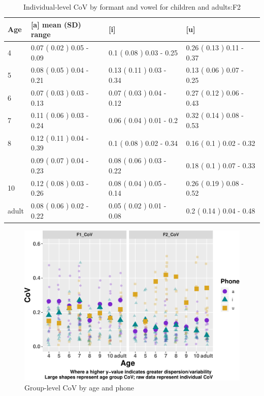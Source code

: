 \documentclass[
]{article}
\begin{document}
\begin{table}[!h]

\caption{\label{tab:delta-disp-tbl-spkr}Individual-level CoV by formant and vowel for children and adults:F2}
\centering
\begin{tabular}[t]{llll}
\toprule
Age & [a] mean (SD) range & [i] & [u]\\
\midrule
4 & 0.07 ( 0.02 ) 0.05 - 0.09 & 0.1 ( 0.08 ) 0.03 - 0.25 & 0.26 ( 0.13 ) 0.11 - 0.37\\
5 & 0.08 ( 0.05 ) 0.04 - 0.21 & 0.13 ( 0.11 ) 0.03 - 0.34 & 0.13 ( 0.06 ) 0.07 - 0.25\\
6 & 0.07 ( 0.03 ) 0.03 - 0.13 & 0.07 ( 0.03 ) 0.04 - 0.12 & 0.27 ( 0.12 ) 0.06 - 0.43\\
7 & 0.11 ( 0.06 ) 0.03 - 0.24 & 0.06 ( 0.04 ) 0.01 - 0.2 & 0.32 ( 0.14 ) 0.08 - 0.53\\
8 & 0.12 ( 0.11 ) 0.04 - 0.39 & 0.1 ( 0.08 ) 0.02 - 0.34 & 0.16 ( 0.1 ) 0.02 - 0.32\\
\addlinespace
9 & 0.09 ( 0.07 ) 0.04 - 0.23 & 0.08 ( 0.06 ) 0.03 - 0.22 & 0.18 ( 0.1 ) 0.07 - 0.33\\
10 & 0.12 ( 0.08 ) 0.03 - 0.26 & 0.08 ( 0.04 ) 0.05 - 0.14 & 0.26 ( 0.19 ) 0.08 - 0.52\\
adult & 0.08 ( 0.06 ) 0.02 - 0.22 & 0.05 ( 0.02 ) 0.01 - 0.08 & 0.2 ( 0.14 ) 0.04 - 0.48\\
\bottomrule
\end{tabular}
\end{table}

\begin{figure}
\centering
\includegraphics{3_vtl_results_files/figure-latex/delta-disp-fig-1.pdf}
\caption{\label{fig:delta-disp-fig}Group-level CoV by age and phone}
\end{figure}
\end{document}
